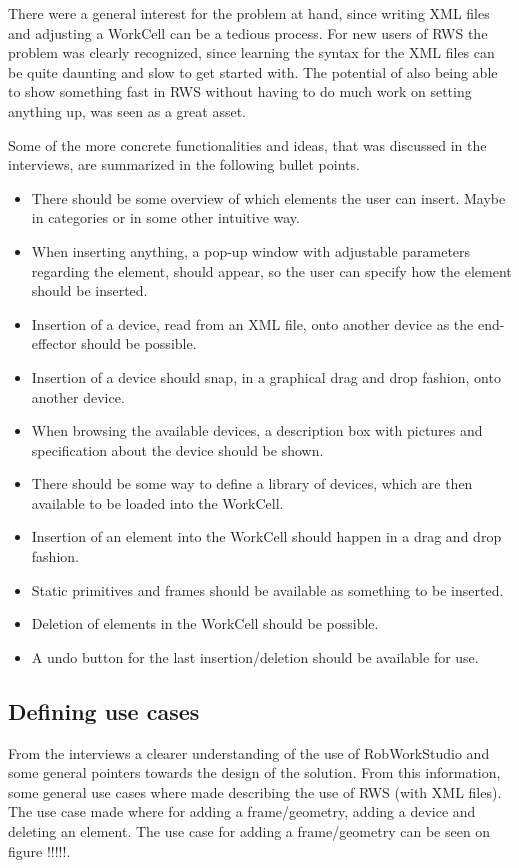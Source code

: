 There were a general interest for the problem at hand, since writing XML files and adjusting a WorkCell can be a tedious process. For new users of RWS the problem was clearly recognized, since learning the syntax for the XML files can be quite daunting and slow to get started with. The potential of also being able to show something fast in RWS without having to do much work on setting anything up, was seen as a great asset.

Some of the more concrete functionalities and ideas, that was discussed in the interviews, are summarized in the following bullet points.

\begin{itemize}
\item There should be some overview of which elements the user can insert. Maybe in categories or in some other intuitive way.
\item When inserting anything, a pop-up window with adjustable parameters regarding the element, should appear, so the user can specify how the element should be inserted.
\item Insertion of a device, read from an XML file, onto another device as the end-effector should be possible.
\item Insertion of a device should snap, in a graphical drag and drop fashion, onto another device.
\item When browsing the available devices, a description box with pictures and specification about the device should be shown.
\item There should be some way to define a library of devices, which are then available to be loaded into the WorkCell.
\item Insertion of an element into the WorkCell should happen in a drag and drop fashion.
\item Static primitives and frames should be available as something to be inserted.
\item Deletion of elements in the WorkCell should be possible.
\item A undo button for the last insertion/deletion should be available for use.
\end{itemize}

\subsection{Defining use cases}
From the interviews a clearer understanding of the use of RobWorkStudio and some general pointers towards the design of the solution. From this information, some general use cases where made describing the use of RWS (with XML files). The use case made where for adding a frame/geometry, adding a device and deleting an element. The use case for adding a frame/geometry can be seen on figure !!!!!.

